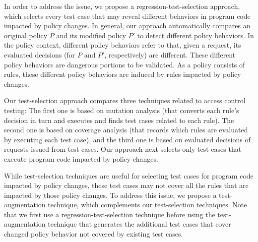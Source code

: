 In order to address the issue, we propose a regression-test-selection approach, which selects every test case that may 
reveal different behaviors in program code impacted by policy changes.
In general, our approach automatically compares an original 
policy $P$ and its modified policy $P'$ to detect different policy behaviors. In the policy context, different policy 
behaviors refer to that, given a request, its evaluated decisions (for $P$ and $P'$, respectively) are different.
These different policy behaviors are dangerous portions to be validated.
As a policy consists of rules, these different policy behaviors are induced by rules impacted by policy changes.




Our test-selection approach compares three techniques related to access control testing:
The first one is based on mutation analysis (that converts each rule's decision in turn and executes 
and finds test cases related to each rule). The second one is based on coverage analysis (that records 
which rules are evaluated by executing each test case), and the third one is based on evaluated decisions of requests issued from test cases. 
Our approach next selects only test cases that execute program code impacted by policy changes.

While test-selection techniques are useful for selecting test cases for program code impacted by policy changes, these test cases may not 
cover all the rules that are impacted by those policy changes.
To address this issue, we propose a test-augmentation technique, which complements our test-selection techniques.
Note that we first use a regression-test-selection technique before using the test-augmentation technique that generates the additional test cases 
that cover changed policy behavior not covered by existing test cases.

